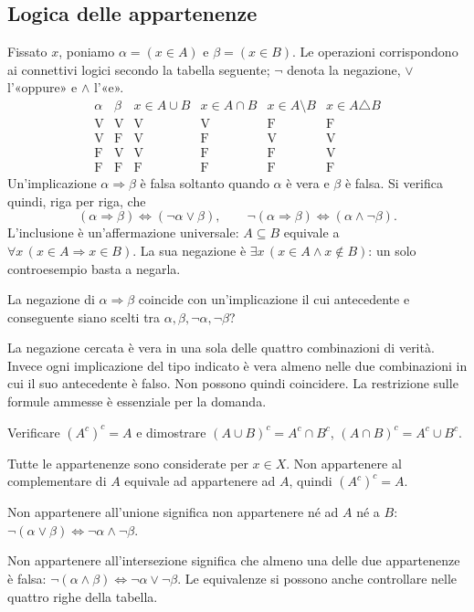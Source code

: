 \subsection{Logica delle appartenenze}
Fissato $x$, poniamo $\alpha=(x\in A)$ e $\beta=(x\in B)$. Le operazioni corrispondono ai connettivi logici secondo la tabella seguente; $\neg$ denota la negazione, $\lor$ l'«oppure» e $\land$ l'«e».
\[
\begin{array}{cc|cccc}
\alpha&\beta&x\in A\cup B&x\in A\cap B&x\in A\setminus B&x\in A\triangle B\\\hline
\mathrm V&\mathrm V&\mathrm V&\mathrm V&\mathrm F&\mathrm F\\
\mathrm V&\mathrm F&\mathrm V&\mathrm F&\mathrm V&\mathrm V\\
\mathrm F&\mathrm V&\mathrm V&\mathrm F&\mathrm F&\mathrm V\\
\mathrm F&\mathrm F&\mathrm F&\mathrm F&\mathrm F&\mathrm F
\end{array}
\]
Un'implicazione $\alpha\Rightarrow\beta$ è falsa soltanto quando $\alpha$ è vera e $\beta$ è falsa. Si verifica quindi, riga per riga, che
\[
(\alpha\Rightarrow\beta)\iff(\neg\alpha\lor\beta),\qquad
\neg(\alpha\Rightarrow\beta)\iff(\alpha\land\neg\beta).
\]
L'inclusione è un'affermazione universale: $A\subseteq B$ equivale a $\forall x\,(x\in A\Rightarrow x\in B)$. La sua negazione è $\exists x\,(x\in A\land x\notin B)$: un solo controesempio basta a negarla.

\begin{esercizio}
La negazione di $\alpha\Rightarrow\beta$ coincide con un'implicazione il cui antecedente e conseguente siano scelti tra $\alpha,\beta,\neg\alpha,\neg\beta$?
\end{esercizio}
\begin{svolgimento}
La negazione cercata è vera in una sola delle quattro combinazioni di verità. Invece ogni implicazione del tipo indicato è vera almeno nelle due combinazioni in cui il suo antecedente è falso. Non possono quindi coincidere. La restrizione sulle formule ammesse è essenziale per la domanda.
\end{svolgimento}

\begin{esercizio}
Verificare $(A^c)^c=A$ e dimostrare $(A\cup B)^c=A^c\cap B^c$, $(A\cap B)^c=A^c\cup B^c$.
\end{esercizio}
\begin{svolgimento}
Tutte le appartenenze sono considerate per $x\in X$. Non appartenere al complementare di $A$ equivale ad appartenere ad $A$, quindi $(A^c)^c=A$.

 Non appartenere all'unione significa non appartenere né ad $A$ né a $B$: $\neg(\alpha\lor\beta)\iff\neg\alpha\land\neg\beta$.

 Non appartenere all'intersezione significa che almeno una delle due appartenenze è falsa: $\neg(\alpha\land\beta)\iff\neg\alpha\lor\neg\beta$. Le equivalenze si possono anche controllare nelle quattro righe della tabella.
\end{svolgimento}

